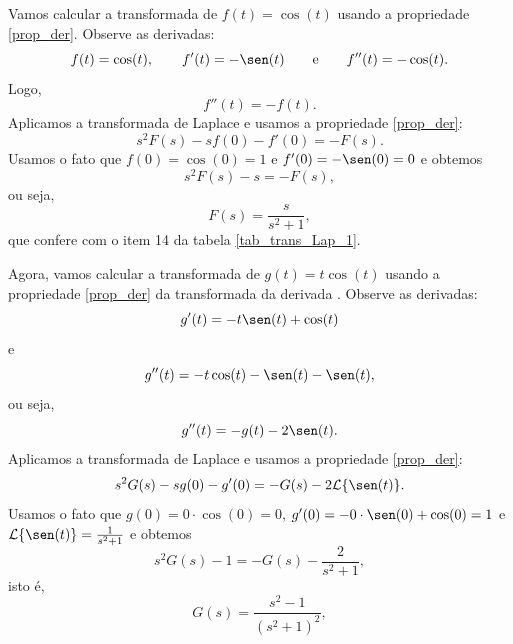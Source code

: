 \begin{ex}Vamos calcular a transformada de $f(t)=\cos(t)$ usando a propriedade \ref{prop_der}. Observe as derivadas:
  \begin{equation}
 f(t)=\cos(t),\qquad f'(t)=-\sen(t)\qquad\hbox{e}\qquad f''(t)=-\cos(t).
\end{equation}
Logo,
 \begin{equation}
f''(t)=-f(t).
\end{equation}
Aplicamos a transformada de Laplace e usamos a propriedade \ref{prop_der}:
 \begin{equation}
s^2F(s)-sf(0)-f'(0)=-F(s).
\end{equation}
Usamos o fato que $f(0)=\cos(0)=1$ e $f'(0)=-\sen(0)=0$ e obtemos
 \begin{equation}
s^2F(s)-s=-F(s),
\end{equation}
ou seja,
 \begin{equation}
F(s)=\frac{s}{s^2+1},
\end{equation}
que confere com o item 14 da tabela \ref{tab_trans_Lap_1}.
\end{ex}
\begin{ex}Agora, vamos calcular a transformada de $g(t)=t\cos(t)$ usando a propriedade \ref{prop_der} da transformada da derivada . Observe as derivadas:
 \begin{equation}
g'(t)=-t\sen(t)+\cos(t)
\end{equation}
e
 \begin{equation}
g''(t)=-t\cos(t)-\sen(t)-\sen(t),
\end{equation}
ou seja,
 \begin{equation}
g''(t)=-g(t)-2\sen(t).
\end{equation}
Aplicamos a transformada de Laplace e usamos a propriedade \ref{prop_der}:
 \begin{equation}
s^2G(s)-sg(0)-g'(0)=-G(s)-2\mathcal{L}\{\sen(t)\}.
\end{equation}
Usamos o fato que $g(0)=0\cdot\cos(0)=0$, $g'(0)=-0\cdot \sen(0)+\cos(0)=1$ e $\mathcal{L}\{\sen(t)\}=\frac{1}{s^2+1}$ e obtemos
 \begin{equation}
s^2G(s)-1=-G(s)-\frac{2}{s^2+1},
\end{equation}
isto é,
 \begin{equation}
G(s)=\frac{s^2-1}{(s^2+1)^2},
\end{equation}
\end{ex}

